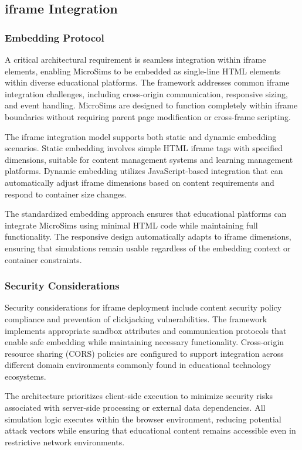 \subsection{iframe Integration}

\subsubsection{Embedding Protocol}

A critical architectural requirement is seamless integration within iframe elements, enabling MicroSims to be embedded as single-line HTML elements within diverse educational platforms. The framework addresses common iframe integration challenges, including cross-origin communication, responsive sizing, and event handling. MicroSims are designed to function completely within iframe boundaries without requiring parent page modification or cross-frame scripting.

The iframe integration model supports both static and dynamic embedding scenarios. Static embedding involves simple HTML iframe tags with specified dimensions, suitable for content management systems and learning management platforms. Dynamic embedding utilizes JavaScript-based integration that can automatically adjust iframe dimensions based on content requirements and respond to container size changes.

The standardized embedding approach ensures that educational platforms can integrate MicroSims using minimal HTML code while maintaining full functionality. The responsive design automatically adapts to iframe dimensions, ensuring that simulations remain usable regardless of the embedding context or container constraints.

\subsubsection{Security Considerations}

Security considerations for iframe deployment include content security policy compliance and prevention of clickjacking vulnerabilities. The framework implements appropriate sandbox attributes and communication protocols that enable safe embedding while maintaining necessary functionality. Cross-origin resource sharing (CORS) policies are configured to support integration across different domain environments commonly found in educational technology ecosystems.

The architecture prioritizes client-side execution to minimize security risks associated with server-side processing or external data dependencies. All simulation logic executes within the browser environment, reducing potential attack vectors while ensuring that educational content remains accessible even in restrictive network environments.

